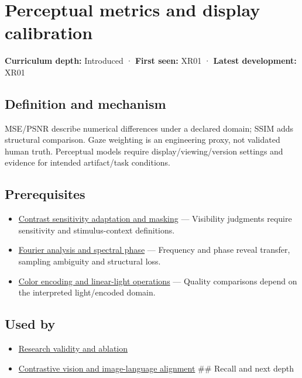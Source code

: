 \hypertarget{appendix-b2c1846508bf}{}\label{referencestart:appendix-b2c1846508bf}
\section{Perceptual metrics and display calibration}\label{appendix-b2c1846508bf-perceptual-metrics-and-display-calibration}

\textbf{Curriculum depth:} Introduced · \textbf{First seen:} XR01 · \textbf{Latest development:} XR01

\subsection{Definition and mechanism}\label{appendix-b2c1846508bf-definition-and-mechanism}

MSE/PSNR describe numerical differences under a declared domain; SSIM adds structural comparison. Gaze weighting is an engineering proxy, not validated human truth. Perceptual models require display/viewing/version settings and evidence for intended artifact/task conditions.

\subsection{Prerequisites}\label{appendix-b2c1846508bf-prerequisites}

\begin{itemize}
\tightlist
\item
  \hyperref[appendix-b3aa9e8e01ad]{Contrast sensitivity adaptation and masking} --- Visibility judgments require sensitivity and stimulus-context definitions.
\item
  \hyperref[appendix-b60686ba06a1]{Fourier analysis and spectral phase} --- Frequency and phase reveal transfer, sampling ambiguity and structural loss.
\item
  \hyperref[appendix-a9f83ad40792]{Color encoding and linear-light operations} --- Quality comparisons depend on the interpreted light/encoded domain.
\end{itemize}

\subsection{Used by}\label{appendix-b2c1846508bf-used-by}

\begin{itemize}
\item
  \hyperref[appendix-65788587ef78]{Research validity and ablation}
\item
  \hyperref[appendix-772f1fd96148]{Contrastive vision and image-language alignment} \#\# Recall and next depth
\end{itemize}

